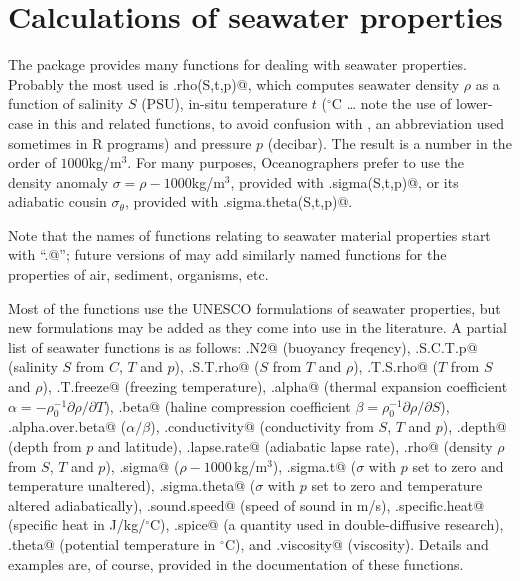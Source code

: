 \documentclass{article}
\begin{document}
\section{Calculations of seawater properties}

The \verb@oce@ package provides many functions for dealing with seawater properties. Probably
the most used is \verb@sw.rho(S,t,p)@, which computes seawater density $\rho$ as a function of
salinity $S$ (PSU), in-situ temperature $t$ ($^\circ$C \dots\/ note the use of lower-case in
this and related functions, to avoid confusion with \verb@T@, an abbreviation used sometimes in
R programs) and pressure $p$ (decibar). The result is a number in the order of $1000$kg/m$^3$.
For many purposes, Oceanographers prefer to use the density anomaly $\sigma=\rho-1000$kg/m$^3$,
provided with \verb@sw.sigma(S,t,p)@, or its adiabatic cousin $\sigma_\theta$, provided with
\verb@sw.sigma.theta(S,t,p)@.

Note that the names of functions relating to seawater material properties start with
``\verb@sw.@''; future versions of \verb@oce@ may add similarly named functions for the
properties of air, sediment, organisms, etc.

Most of the functions use the UNESCO formulations of seawater properties, but new formulations
may be added as they come into use in the literature.
A partial list of seawater functions is as follows:
\verb@sw.N2@ (buoyancy freqency),
\verb@sw.S.C.T.p@ (salinity $S$ from $C$, $T$ and $p$),
\verb@sw.S.T.rho@ ($S$ from $T$ and $\rho$),
\verb@sw.T.S.rho@ ($T$ from $S$ and $\rho$),
\verb@sw.T.freeze@ (freezing temperature),
\verb@sw.alpha@ (thermal expansion coefficient $\alpha=-\rho_0^{-1}\partial\rho/\partial T$),
\verb@sw.beta@ (haline compression coefficient $\beta=\rho_0^{-1}\partial\rho/\partial S$),
\verb@sw.alpha.over.beta@ ($\alpha/\beta$),
\verb@sw.conductivity@ (conductivity from $S$, $T$ and $p$), 
\verb@sw.depth@ (depth from $p$ and latitude), 
\verb@sw.lapse.rate@ (adiabatic lapse rate), 
\verb@sw.rho@ (density $\rho$ from $S$, $T$ and $p$), 
\verb@sw.sigma@ ($\rho-1000$\,kg/m$^3$), 
\verb@sw.sigma.t@ ($\sigma$ with $p$ set to zero and temperature unaltered),
\verb@sw.sigma.theta@ ($\sigma$ with $p$ set to zero and temperature altered adiabatically),
\verb@sw.sound.speed@ (speed of sound in m/s),
\verb@sw.specific.heat@ (specific heat in J/kg/$^\circ$C),
\verb@sw.spice@ (a quantity used in double-diffusive research),
\verb@sw.theta@ (potential temperature in $^\circ$C),
and
\verb@sw.viscosity@ (viscosity).
Details and examples are, of course, provided in the documentation of these functions.
\end{document}
